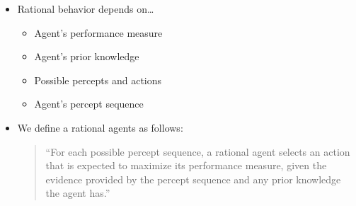 \begin{itemize}
    \item Rational behavior depends on\ldots
        \begin{itemize}
            \item Agent's performance measure
            \item Agent's prior knowledge
            \item Possible percepts and actions
            \item Agent's percept sequence
        \end{itemize}

    \item We define a rational agents as follows:
        \begin{quote}
            ``For each possible percept sequence, a rational agent selects an action that is expected to maximize its performance measure, given the evidence provided by the percept sequence and any prior knowledge the agent has.''
        \end{quote}


\end{itemize}
